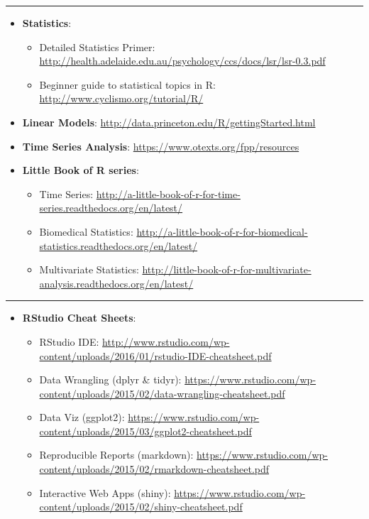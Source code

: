 \documentclass[]{book}
\providecommand{\tightlist}{%
  \setlength{\itemsep}{0pt}\setlength{\parskip}{0pt}}
\begin{document}
\begin{center}\rule{0.5\linewidth}{0.5pt}\end{center}

\begin{itemize}
\tightlist
\item
  \textbf{Statistics}:

  \begin{itemize}
  \tightlist
  \item
    Detailed Statistics Primer: \url{http://health.adelaide.edu.au/psychology/ccs/docs/lsr/lsr-0.3.pdf}
  \item
    Beginner guide to statistical topics in R: \url{http://www.cyclismo.org/tutorial/R/}
  \end{itemize}
\item
  \textbf{Linear Models}: \url{http://data.princeton.edu/R/gettingStarted.html}
\item
  \textbf{Time Series Analysis}: \url{https://www.otexts.org/fpp/resources}
\item
  \textbf{Little Book of R series}:

  \begin{itemize}
  \tightlist
  \item
    Time Series: \url{http://a-little-book-of-r-for-time-series.readthedocs.org/en/latest/}
  \item
    Biomedical Statistics: \url{http://a-little-book-of-r-for-biomedical-statistics.readthedocs.org/en/latest/}
  \item
    Multivariate Statistics: \url{http://little-book-of-r-for-multivariate-analysis.readthedocs.org/en/latest/}
  \end{itemize}
\end{itemize}

\begin{center}\rule{0.5\linewidth}{0.5pt}\end{center}

\begin{itemize}
\tightlist
\item
  \textbf{RStudio Cheat Sheets}:

  \begin{itemize}
  \tightlist
  \item
    RStudio IDE: \url{http://www.rstudio.com/wp-content/uploads/2016/01/rstudio-IDE-cheatsheet.pdf}
  \item
    Data Wrangling (dplyr \& tidyr): \url{https://www.rstudio.com/wp-content/uploads/2015/02/data-wrangling-cheatsheet.pdf}
  \item
    Data Viz (ggplot2): \url{https://www.rstudio.com/wp-content/uploads/2015/03/ggplot2-cheatsheet.pdf}
  \item
    Reproducible Reports (markdown): \url{https://www.rstudio.com/wp-content/uploads/2015/02/rmarkdown-cheatsheet.pdf}
  \item
    Interactive Web Apps (shiny): \url{https://www.rstudio.com/wp-content/uploads/2015/02/shiny-cheatsheet.pdf}
  \end{itemize}
\end{itemize}
\end{document}
